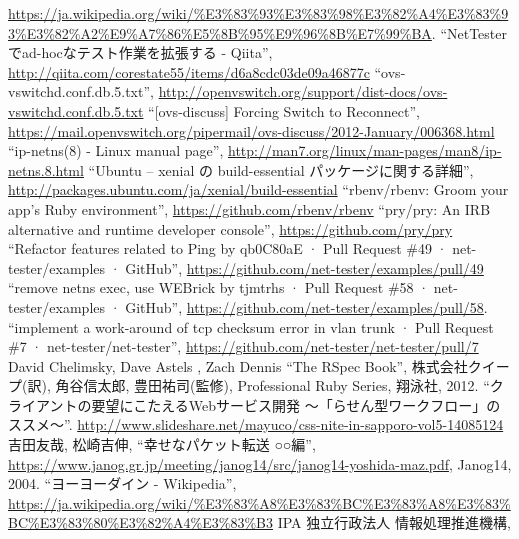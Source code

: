 \begin{thebibliography}{99}
         \url{https://ja.wikipedia.org/wiki/%E3%83%93%E3%83%98%E3%82%A4%E3%83%93%E3%82%A2%E9%A7%86%E5%8B%95%E9%96%8B%E7%99%BA}.
         ``NetTesterでad-hocなテスト作業を拡張する - Qiita'',
         \url{http://qiita.com/corestate55/items/d6a8cdc03de09a46877c}
         ``ovs-vswitchd.conf.db.5.txt'',
         \url{http://openvswitch.org/support/dist-docs/ovs-vswitchd.conf.db.5.txt}
         ``[ovs-discuss] Forcing Switch to Reconnect'',
         \url{https://mail.openvswitch.org/pipermail/ovs-discuss/2012-January/006368.html}
         ``ip-netns(8) - Linux manual page'',
         \url{http://man7.org/linux/man-pages/man8/ip-netns.8.html}
         ``Ubuntu – xenial の build-essential パッケージに関する詳細'',
         \url{http://packages.ubuntu.com/ja/xenial/build-essential}
         ``rbenv/rbenv: Groom your app’s Ruby environment'',
         \url{https://github.com/rbenv/rbenv}
         ``pry/pry: An IRB alternative and runtime developer console'',
         \url{https://github.com/pry/pry}
  ``Refactor features related to Ping by qb0C80aE
         · Pull Request \#49 · net-tester/examples · GitHub'',
         \url{https://github.com/net-tester/examples/pull/49}
  ``remove netns exec, use WEBrick by tjmtrhs ·
         Pull Request \#58 · net-tester/examples · GitHub'',
         \url{https://github.com/net-tester/examples/pull/58}.
  ``implement a work-around of tcp checksum
         error in vlan trunk · Pull Request \#7 ·
         net-tester/net-tester'',
         \url{https://github.com/net-tester/net-tester/pull/7}
  David Chelimsky, Dave Astels , Zach Dennis ``The
         RSpec Book'', 株式会社クイープ(訳), 角谷信太郎, 豊田祐司(監修),
         Professional Ruby Series, 翔泳社, 2012.
         ``クライアントの要望にこたえるWebサービス開発 ～「らせん型ワークフロー」のススメ～''.
         \url{http://www.slideshare.net/mayuco/css-nite-in-sapporo-vol5-14085124}
         吉田友哉, 松崎吉伸,
         ``幸せなパケット転送 ○○編'',
         \url{https://www.janog.gr.jp/meeting/janog14/src/janog14-yoshida-maz.pdf},
         Janog14, 2004.
         ``ヨーヨーダイン - Wikipedia'',
         \url{https://ja.wikipedia.org/wiki/\%E3\%83\%A8\%E3\%83\%BC\%E3\%83\%A8\%E3\%83\%BC\%E3\%83\%80\%E3\%82\%A4\%E3\%83\%B3}
         IPA 独立行政法人 情報処理推進機構,

\end{thebibliography}
